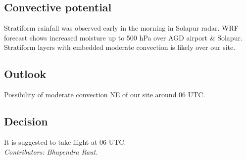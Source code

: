 \subsection*{Convective potential}
Stratiform rainfall was observed early in the morning in Solapur radar.
WRF forecast shows increased moisture up to 500 hPa over AGD airport \& Solapur. Stratiform layers with embedded moderate convection is likely over our site. %

\subsection*{Outlook}
Possibility of moderate convection NE of our site around 06 UTC.\\
\subsection*{Decision}
It is suggested to take flight at 06 UTC.\\ 



\vfill %
\textit{Contributors: Bhupendra Raut.} 

